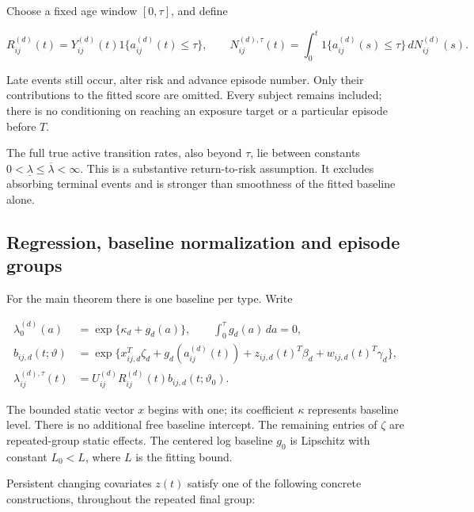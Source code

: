 \documentclass[11pt]{article}
\begin{document}
Choose a fixed age window \([0,\tau]\), and define

\begin{equation*}
R_{ij}^{(d)}(t)=Y_{ij}^{(d)}(t)1\{a_{ij}^{(d)}(t)\leq\tau\},\qquad
N_{ij}^{(d),\tau}(t)=\int_0^t1\{a_{ij}^{(d)}(s)\leq\tau\}\,dN_{ij}^{(d)}(s).
\tag{4}\label{eq:4}
\end{equation*}

Late events still occur, alter risk and advance episode number. Only their contributions to the fitted score are omitted. Every subject remains included; there is no conditioning on reaching an exposure target or a particular episode before \(T\).

The full true active transition rates, also beyond \(\tau\), lie between constants \(0<\underline\lambda\leq\overline\lambda<\infty\). This is a substantive return-to-risk assumption. It excludes absorbing terminal events and is stronger than smoothness of the fitted baseline alone.

\subsection{Regression, baseline normalization and episode groups}\label{sec:2.3}

For the main theorem there is one baseline per type. Write

\begin{equation*}
\begin{aligned}
\lambda_{0}^{(d)}(a)&=\exp\{\kappa_d+g_d(a)\},\qquad
\int_0^\tau g_d(a)\,da=0,\\
b_{ij,d}(t;\vartheta)&=
\exp\{x_{ij,d}^T\zeta_d+g_d(a_{ij}^{(d)}(t))
+z_{ij,d}(t)^T\beta_d+w_{ij,d}(t)^T\gamma_d\},\\
\lambda_{ij}^{(d),\tau}(t)&=U_{ij}^{(d)}R_{ij}^{(d)}(t)b_{ij,d}(t;\vartheta_0).
\end{aligned}\tag{5}\label{eq:5}
\end{equation*}

The bounded static vector \(x\) begins with one; its coefficient \(\kappa\) represents baseline level. There is no additional free baseline intercept. The remaining entries of \(\zeta\) are repeated-group static effects. The centered log baseline \(g_0\) is Lipschitz with constant \(L_0<L\), where \(L\) is the fitting bound.

Persistent changing covariates \(z(t)\) satisfy one of the following concrete constructions, throughout the repeated final group:
\end{document}
